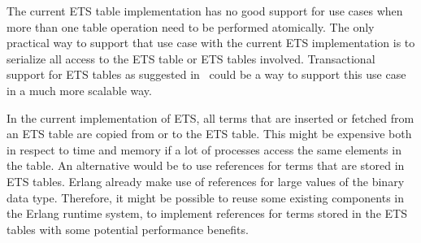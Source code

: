 \documentclass[aps,pre,preprint,nofootinbib]{revtex4}
\begin{document}
  The current ETS table implementation has no good support for use cases when more than one table operation need to be performed atomically.
  The only practical way to support that use case with the current ETS implementation is to serialize all access to the ETS table or ETS tables involved.
  Transactional support for ETS tables as suggested in~\cite{PatrikErlangTrans} could be a way to support this use case in a much more scalable way.
  
  In the current implementation of ETS, all terms that are inserted or fetched from an ETS table are copied from or to the ETS table.
  This might be expensive both in respect to time and memory if a lot of processes access the same elements in the table.
  An alternative would be to use references for terms that are stored in ETS tables. 
  Erlang already make use of references for large values of the binary data type.
  Therefore, it might be possible to reuse some existing components in the Erlang runtime system, to implement references for terms stored in the ETS tables with some potential performance benefits.
  
  

  

  


  
\end{document}
